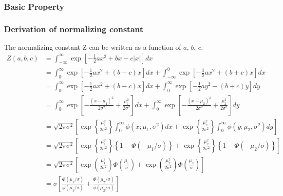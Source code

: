 \subsubsection{Basic Property}
\subsubsection{Derivation of normalizing constant}
The normalizing constant Z can be written as a function of $a$, $b$, $c$.
$$
\begin{array}{rl}
	Z(a,b,c)
	&  = \int_{-\infty}^\infty \exp\left[ -\tfrac{1}{2}ax^2 + bx - c|x| \right] dx
	\\ [2ex]
	&  
	= \int_0^\infty    \exp\left[ -\tfrac{1}{2}ax^2 + (b - c)x \right] dx
	+ \int_{-\infty}^0 \exp\left[ -\tfrac{1}{2}ax^2 + (b + c)x \right] dx
	\\ [2ex]
	& 
	= \int_0^\infty \exp\left[ -\tfrac{1}{2}ax^2 + (b - c)x \right] dx
	+ \int_0^\infty \exp\left[ -\tfrac{1}{2}ay^2 - (b + c)y \right] dy
	\\ [2ex]
	& 
	= \int_0^\infty \exp\left[ - \frac{(x - \mu_1)^2}{2\sigma^2} + \frac{\mu_1^2}{2\sigma^2} \right] dx
	+ \int_0^\infty \exp\left[ - \frac{(x - \mu_2)^2}{2\sigma^2} + \frac{\mu_2^2}{2\sigma^2} \right] dy
	\\ [2ex]	& 
	= \sqrt{2\pi\sigma^2}
	\left[  \exp\left\{  \frac{\mu_1^2}{2\sigma^2} \right\} \int_0^\infty \phi(x;\mu_1,\sigma^2) dx
	+       \exp\left\{  \frac{\mu_2^2}{2\sigma^2} \right\} \int_0^\infty \phi(y;\mu_2,\sigma^2) dy
	\right] 
	\\ [2ex]
	& 
	= \sqrt{2\pi\sigma^2}
	\left[  \exp\left\{  \frac{\mu_1^2}{2\sigma^2} \right\} \left\{ 1 - \Phi(-\mu_1/\sigma) \right\} 
	+       \exp\left\{  \frac{\mu_2^2}{2\sigma^2} \right\} \left\{ 1 - \Phi(-\mu_2/\sigma) \right\} 
	\right] 
	\\ [2ex]
	& 
	= \sqrt{2\pi\sigma^2}
	\left[  \exp\left(  \frac{\mu_1^2}{2\sigma^2} \right) \Phi\left(\frac{\mu_1}{\sigma} \right) 
	+       \exp\left(  \frac{\mu_2^2}{2\sigma^2} \right) \Phi\left( \frac{\mu_2}{\sigma} \right)  
	\right] 
	
	
	\\ [2ex]
	& 
	= 
	\sigma \left[ \frac{\Phi(\mu_1/\sigma)}{\phi(\mu_1/\sigma)}
	+ \frac{\Phi(\mu_2/\sigma)}{\phi(\mu_2/\sigma)}  \right] 
\end{array} 
$$

